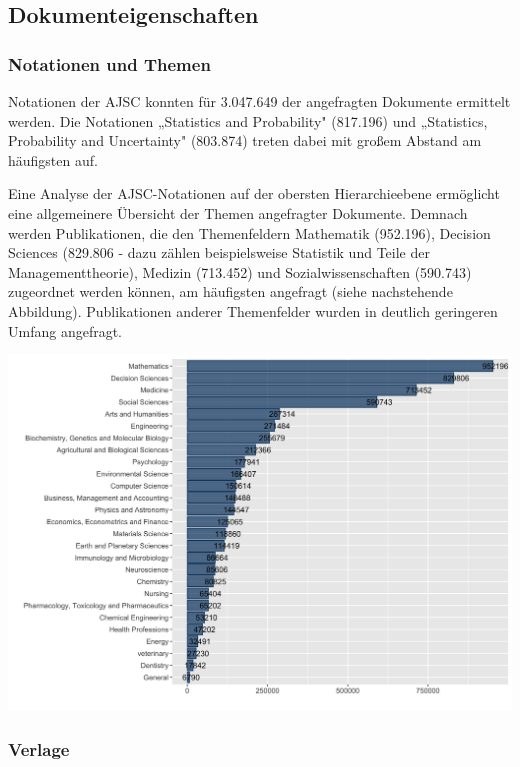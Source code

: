 \documentclass[a4paper,
fontsize=11pt,
oneside,
numbers=noperiodatend,
parskip=half-,
bibliography=totoc,
final
]{scrartcl}
\begin{document}
\hypertarget{dokumenteigenschaften}{%
\subsection{Dokumenteigenschaften}\label{dokumenteigenschaften}}

\hypertarget{notationen-und-themen}{%
\subsubsection{Notationen und Themen}\label{notationen-und-themen}}

Notationen der AJSC konnten für 3.047.649 der angefragten Dokumente
ermittelt werden. Die Notationen „Statistics and Probability" (817.196)
und „Statistics, Probability and Uncertainty" (803.874) treten dabei mit
großem Abstand am häufigsten auf.

Eine Analyse der AJSC-Notationen auf der obersten Hierarchieebene
ermöglicht eine allgemeinere Übersicht der Themen angefragter Dokumente.
Demnach werden Publikationen, die den Themenfeldern Mathematik
(952.196), Decision Sciences (829.806 - dazu zählen beispielsweise
Statistik und Teile der Managementtheorie), Medizin (713.452) und
Sozialwissenschaften (590.743) zugeordnet werden können, am häufigsten
angefragt (siehe nachstehende Abbildung). Publikationen anderer
Themenfelder wurden in deutlich geringeren Umfang angefragt.

\includegraphics{images/Downloads_Themen.png}

\hypertarget{verlage}{%
\subsubsection{Verlage}\label{verlage}}
\end{document}
